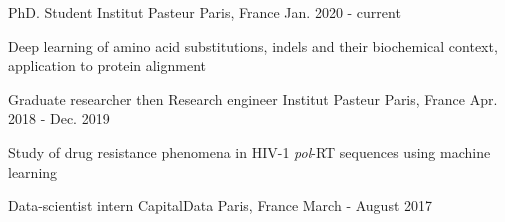 

\begin{cventries}

  \cventry
  {PhD. Student} %
  {Institut Pasteur} %
  {Paris, France} %
  {Jan. 2020 - current} %
  {
    \begin{cvitems} %
      \item {Deep learning of amino acid substitutions, indels and their biochemical context, application to protein alignment }
    \end{cvitems}
  }
  \cventry
    {Graduate researcher then Research engineer} %
    {Institut Pasteur} %
    {Paris, France} %
    {Apr. 2018 - Dec. 2019} %
    {
      \begin{cvitems} %
        \item {Study of drug resistance phenomena in HIV-1 \textit{pol}-RT sequences using machine learning}
      \end{cvitems}
    }
    \cventry
    {Data-scientist intern} %
    {CapitalData} %
    {Paris, France} %
    {March - August 2017} %
    {
      \begin{cvitems} %

\end{cvitems}}
\end{cventries}
